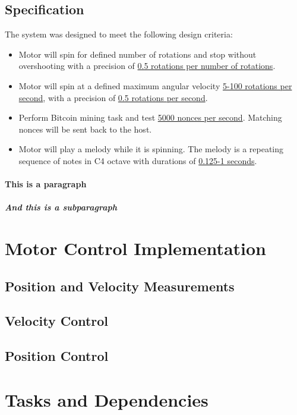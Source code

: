 \documentclass{article}
\begin{document}
\subsection{Specification}
\noindent The system was designed to meet the following design criteria:
 \begin{itemize}
	\item Motor will spin for defined number of rotations and stop without overshooting with a precision of \underline{0.5 rotations per number of rotations}.
	\item Motor will spin at a defined maximum angular velocity \underline{5-100 rotations per second}, with a precision of \underline{0.5 rotations per second}.
	\item Perform Bitcoin mining task and test \underline{5000 nonces per second}. Matching nonces will be sent back to the host.
	\item Motor will play a melody while it is spinning. The melody is a repeating sequence of notes in C4 octave with durations of \underline{0.125-1 seconds}.
\end{itemize}

\paragraph{This is a paragraph}
\lipsum[2]

\subparagraph{And this is a subparagraph}
\lipsum[3]




\section{Motor Control Implementation}
\subsection{Position and Velocity Measurements}

\subsection{Velocity Control}

\subsection{Position Control}



\section{Tasks and Dependencies}
\end{document}
